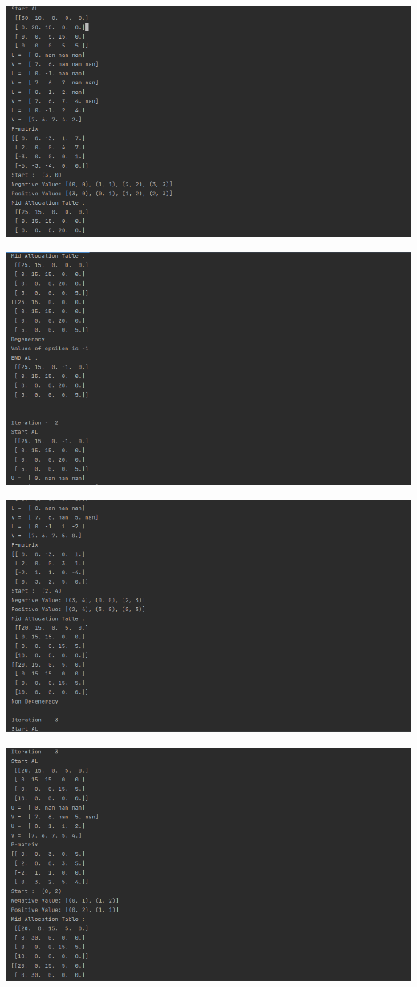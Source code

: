 \documentclass[12pt, letterpaper, twoside]{book}
\begin{document}
\includegraphics[width=550pt]{Output2}

\includegraphics[width=550pt]{Output3}

\includegraphics[width=550pt]{Output4}

\includegraphics[width=550pt]{Output5}
\end{document}
